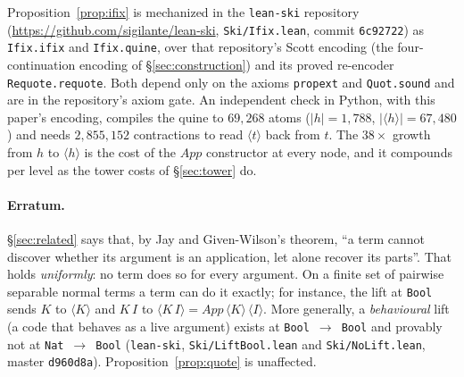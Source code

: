 Proposition~\ref{prop:ifix} is mechanized in the \texttt{lean-ski} repository
(\url{https://github.com/sigilante/lean-ski}, \texttt{Ski/Ifix.lean}, commit
\texttt{6c92722}) as \texttt{Ifix.ifix} and \texttt{Ifix.quine}, over that
repository's Scott encoding (the four-continuation encoding of
\S\ref{sec:construction}) and its proved re-encoder \texttt{Requote.requote}.
Both depend only on the axioms \texttt{propext} and \texttt{Quot.sound} and are
in the repository's axiom gate.  An independent check in Python, with this
paper's encoding, compiles the quine to $69{,}268$ atoms ($|h| = 1{,}788$,
$|\langle h\rangle| = 67{,}480$) and needs $2{,}855{,}152$ contractions to read
$\langle t\rangle$ back from $t$.  The $38\times$ growth from $h$ to
$\langle h\rangle$ is the cost of the $\mathit{App}$ constructor at every node,
and it compounds per level as the tower costs of \S\ref{sec:tower} do.


\paragraph{Erratum.}  \S\ref{sec:related} says that, by Jay and Given-Wilson's
theorem, ``a term cannot discover whether its argument is an application, let
alone recover its parts''.  That holds \emph{uniformly}: no term does so for
every argument.  On a finite set of pairwise separable normal terms a term can
do it exactly; for instance, the lift at \texttt{Bool} sends $K$ to
$\langle K\rangle$ and $K\,I$ to $\langle K\,I\rangle = \mathit{App}\,\langle
K\rangle\,\langle I\rangle$.  More generally, a \emph{behavioural} lift (a code
that behaves as a live argument) exists at \texttt{Bool}~$\to$~\texttt{Bool}
and provably not at \texttt{Nat}~$\to$~\texttt{Bool} (\texttt{lean-ski},
\texttt{Ski/LiftBool.lean} and \texttt{Ski/NoLift.lean}, master
\texttt{d960d8a}).  Proposition~\ref{prop:quote} is unaffected.
